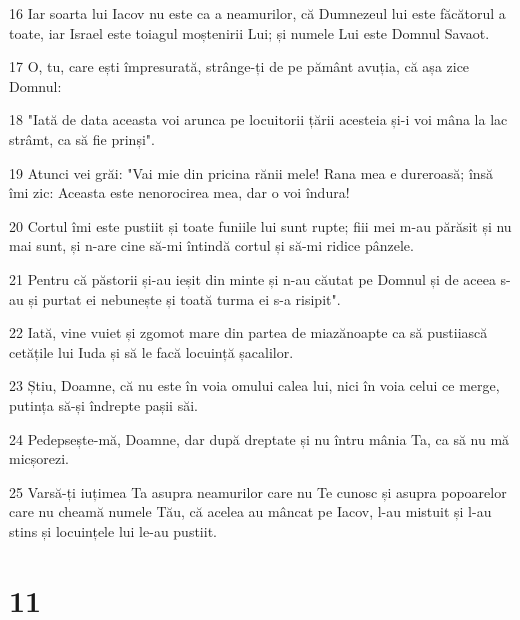 \par 16 Iar soarta lui Iacov nu este ca a neamurilor, că Dumnezeul lui este făcătorul a toate, iar Israel este toiagul moștenirii Lui; și numele Lui este Domnul Savaot.
\par 17 O, tu, care ești împresurată, strânge-ți de pe pământ avuția, că așa zice Domnul:
\par 18 "Iată de data aceasta voi arunca pe locuitorii țării acesteia și-i voi mâna la lac strâmt, ca să fie prinși".
\par 19 Atunci vei grăi: "Vai mie din pricina rănii mele! Rana mea e dureroasă; însă îmi zic: Aceasta este nenorocirea mea, dar o voi îndura!
\par 20 Cortul îmi este pustiit și toate funiile lui sunt rupte; fiii mei m-au părăsit și nu mai sunt, și n-are cine să-mi întindă cortul și să-mi ridice pânzele.
\par 21 Pentru că păstorii și-au ieșit din minte și n-au căutat pe Domnul și de aceea s-au și purtat ei nebunește și toată turma ei s-a risipit".
\par 22 Iată, vine vuiet și zgomot mare din partea de miazănoapte ca să pustiiască cetățile lui Iuda și să le facă locuință șacalilor.
\par 23 Știu, Doamne, că nu este în voia omului calea lui, nici în voia celui ce merge, putința să-și îndrepte pașii săi.
\par 24 Pedepsește-mă, Doamne, dar după dreptate și nu întru mânia Ta, ca să nu mă micșorezi.
\par 25 Varsă-ți iuțimea Ta asupra neamurilor care nu Te cunosc și asupra popoarelor care nu cheamă numele Tău, că acelea au mâncat pe Iacov, l-au mistuit și l-au stins și locuințele lui le-au pustiit.

\chapter{11}

